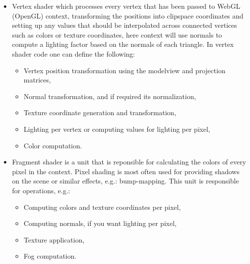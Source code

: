 \begin{itemize}
\item Vertex shader which processes every vertex that has been passed to WebGL (OpenGL) context, transforming the positions into clipspace coordinates and setting up any values that should be interpolated across connected vertices such as colors or texture coordinates, here context will use normals to compute a lighting factor based on the normals of each triangle.
In vertex shader code one can define the following: 
\begin{itemize}
\item Vertex position transformation using the modelview and projection matrices,
\item Normal transformation, and if required its normalization,
\item Texture coordinate generation and transformation,
\item Lighting per vertex or computing values for lighting per pixel,
\item Color computation.
\end{itemize}
\item Fragment shader is a unit that is reponsible for calculating the colors of every pixel in the context. Pixel shading is most often used for providing shadows on the scene or similar effects, e.g.: bump-mapping.
This unit is responsible for operations, e.g.:
\begin{itemize}
\item Computing colors and texture coordinates per pixel,
\item Computing normals, if you want lighting per pixel,
\item Texture application,
\item Fog computation.
\end{itemize}
\end{itemize}

